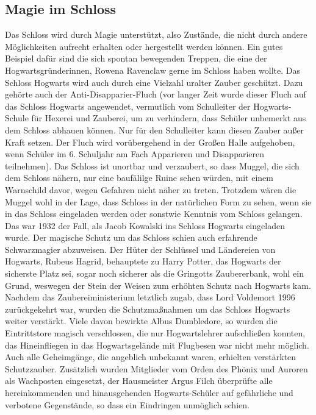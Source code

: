 \documentclass[a4paper, 10pt]{article}
\begin{document}
\subsection*{\Large Magie im Schloss}
Das Schloss wird durch Magie unterstützt, also Zustände, die nicht durch andere Möglichkeiten aufrecht erhalten oder hergestellt werden können. Ein gutes Beispiel dafür sind die sich spontan bewegenden Treppen, die eine der Hogwartsgründerinnen, Rowena Ravenclaw gerne im Schloss haben wollte. Das Schloss Hogwarts wird auch durch eine Vielzahl uralter Zauber geschützt. Dazu gehörte auch der Anti-Disapparier-Fluch (vor langer Zeit wurde dieser Fluch auf das Schloss Hogwarts angewendet, vermutlich vom Schulleiter der Hogwarts-Schule für Hexerei und Zauberei, um zu verhindern, dass Schüler unbemerkt aus dem Schloss abhauen können. Nur für den Schulleiter kann diesen Zauber außer Kraft setzen. Der Fluch wird vorübergehend in der Großen Halle aufgehoben, wenn Schüler im 6. Schuljahr am Fach Apparieren und Disapparieren teilnehmen). Das Schloss ist unortbar und verzaubert, so dass Muggel, die sich dem Schloss nähern, nur eine baufälilge Ruine sehen würden, mit einem Warnschild davor, wegen Gefahren nicht näher zu treten. Trotzdem wären die Muggel wohl in der Lage, dass Schloss in der natürlichen Form zu sehen, wenn sie in das Schloss eingeladen werden oder sonstwie Kenntnis vom Schloss gelangen. Das war 1932 der Fall, als Jacob Kowalski ins Schloss Hogwarts eingeladen wurde. Der magische Schutz um das Schloss schien auch erfahrende Schwarzmagier abzuweisen.
\vspace{10pt}
\newline
Der Hüter der Schlüssel und Ländereien von Hogwarts, Rubeus Hagrid, behauptete zu Harry Potter, das Hogwarts der sicherste Platz sei, sogar noch sicherer als die Gringotts Zaubererbank, wohl ein Grund, weswegen der Stein der Weisen zum erhöhten Schutz nach Hogwarts kam. Nachdem das Zaubereiministerium letztlich zugab, dass Lord Voldemort 1996 zurückgekehrt war, wurden die Schutzmaßnahmen um das Schloss Hogwarts weiter verstärkt. Viele davon bewirkte Albus Dumbledore, so wurden die Eintrittstore magisch verschlossen, die nur Hogwartslehrer aufschließen konnten, das Hineinfliegen in das Hogwartsgelände mit Flugbesen war nicht mehr möglich. Auch alle Geheimgänge, die angeblich unbekannt waren, erhielten verstärkten Schutzzauber. Zusätzlich wurden Mitglieder vom Orden des Phönix und Auroren als Wachposten eingesetzt, der Hausmeister Argus Filch überprüfte alle hereinkommenden und hinausgehenden Hogwarts-Schüler auf gefährliche und verbotene Gegenstände, so dass ein Eindringen unmöglich schien.
\end{document}
